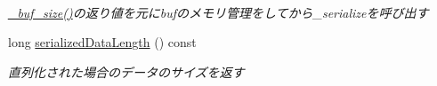 \begin{DoxyCompactItemize}
$$\begin{DoxyCompactList}\small\item\em \hyperlink{classskl_1_1_serializable_a489e26e25bacf78d0dae50f0286c62b5}{\+\_\+buf\+\_\+size()}の返り値を元にbufのメモリ管理をしてから\+\_\+serializeを呼び出す \end{DoxyCompactList}\item 
\hypertarget{classskl_1_1_serializable_aa2710ac29cb9cd325bc8624c5cfc8f7d}{}\label{classskl_1_1_serializable_aa2710ac29cb9cd325bc8624c5cfc8f7d} 
long \hyperlink{classskl_1_1_serializable_aa2710ac29cb9cd325bc8624c5cfc8f7d}{serialized\+Data\+Length} () const
\begin{DoxyCompactList}\small\item\em 直列化された場合のデータのサイズを返す \end{DoxyCompactList}\end{DoxyCompactItemize}
